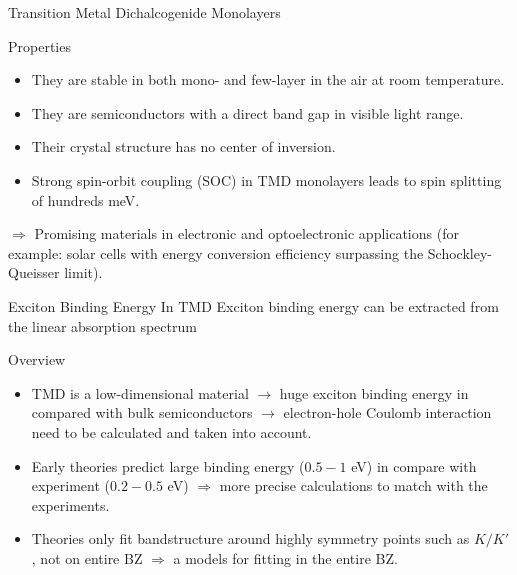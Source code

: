 \documentclass{beamer}
\begin{document}
	\begin{frame}{Transition Metal Dichalcogenide Monolayers}
\begin{block}{Properties}
\begin{itemize}
\item They are stable in both mono- and few-layer in the air at room temperature. \\
\item They are semiconductors with a direct band gap in visible light range.
\item Their crystal structure has no center of inversion.\\
\item Strong spin-orbit coupling (SOC) in TMD monolayers leads to spin splitting of hundreds meV.
\end{itemize}
\end{block}
$\Rightarrow$ Promising materials in electronic and optoelectronic applications (for example: solar cells with energy conversion efficiency surpassing the Schockley-Queisser limit).
	\end{frame}
	\begin{frame}{Exciton Binding Energy In TMD}
Exciton binding energy can be extracted from the linear absorption spectrum
\begin{block}{Overview}
\begin{itemize}
\item TMD is a low-dimensional material $\to$ huge exciton binding energy in compared with bulk semiconductors $\to$ electron-hole Coulomb interaction need to be calculated and taken into account.
\item Early theories predict large binding energy ($0.5-1$ eV) in compare with experiment ($0.2-0.5$ eV) $\Rightarrow$ more precise calculations to match with the experiments.
\item Theories only fit bandstructure around highly symmetry points such as $K/K'$, not on entire BZ $\Rightarrow$ a models for fitting in the entire BZ.
		\end{itemize}
\end{block}
	\end{frame}
\end{document}
